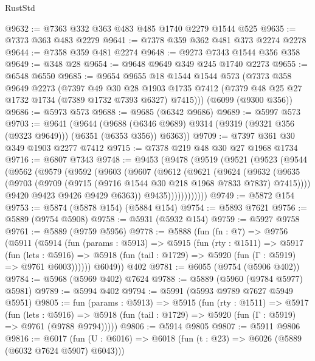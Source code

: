 \begin{lexlean}{RustStd}
\begin{coremodule}
@9632 := @7363 @332 @363 @483 @485 @1740 @2279 @1544 @525
@9635 := @7373 @363 @483 @2279
@9641 := @7378 @359 @362 @481 @373 @2274 @2278
@9644 := @7358 @359 @481 @2274
@9648 := @9273 @7343 @1544 @356 @358
@9649 := @348 @28
@9654 := @9648 @9649 @349 @245 @1740 @2273
@9655 := @6548 @6550
@9685 := @9654
    @9655
    @18
    @1544
    @1544
    @573
    (@7373
      @358
      @9649
      @2273
      (@7397
        @49
        @30
        @28
        @1903
        @1735
        @7412
        (@7379 @48 @25 @27 @1732 @1734 (@7389 @1732 @7393 @6327) @7415)))
    (@6099 (@9300 @356))
@9686 := @5973 @573
@9688 := @9685 (@6342 @9686)
@9689 := @5997 @573
@9703 := @9641
    (@9644
      (@9688 (@6346 @9689) @9314 (@9319 (@9321 @356 (@9323 @9649))) (@6351 (@6353 @356)) @6363))
@9709 := @7397 @361 @30 @349 @1903 @2277 @7412
@9715 := @7378 @219 @48 @30 @27 @1968 @1734
@9716 := @6807 @7343
@9748 := @9453
    (@9478
      (@9519
        (@9521
          (@9523
            (@9544
              (@9562
                (@9579
                  (@9592
                    (@9603
                      (@9607
                        (@9612
                          (@9621
                            (@9624
                              (@9632
                                (@9635
                                  (@9703
                                    (@9709 (@9715 (@9716 @1544 @30 @218 @1968 @7833 @7837) @7415))))
                                @9420
                                @9423
                                @9426
                                @9429
                                @6363))
                            @9435))))))))))))
@9749 := @5872 @154
@9753 := @5874 (@5878 @154) (@5884 @154)
@9754 := @5893 @7621
@9756 := @5889 (@9754 @5908)
@9758 := @5931 (@5932 @154)
@9759 := @5927 @9758
@9761 := @5889 (@9759 @5956)
@9778 := @5888
    (fun (fn : @7) =>
    @9756
      (@5911
        (@5914
          (fun (params : @5913) =>
          @5915
            (fun (rty : @1511) =>
            @5917
              (fun (lets : @5916) =>
              @5918 (fun (tail : @1729) => @5920 (fun (Γ : @5919) => @9761 @6003))))))
        @6049))
    @402
@9781 := @6055 (@9754 (@5906 @402))
@9784 := @5968 (@5969 @402) @7624
@9788 := @5889 (@5960 (@9784 @5977) @5981)
@9789 := @5994 @402
@9794 := @5991 (@5993 @9789 @7627 @5949 @5951)
@9805 := fun (params : @5913) =>
  @5915
    (fun (rty : @1511) =>
    @5917
      (fun (lets : @5916) =>
      @5918 (fun (tail : @1729) => @5920 (fun (Γ : @5919) => @9761 (@9788 @9794)))))
@9806 := @5914 @9805
@9807 := @5911 @9806
@9816 := @6017 (fun (U : @6016) => @6018 (fun (t : @23) => @6026 (@5889 (@6032 @7624 @5907) @6043)))

\end{coremodule}
\end{lexlean}
